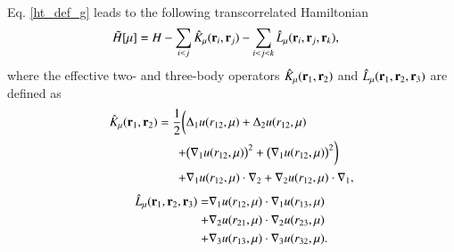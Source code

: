 \documentclass[aip,jcp,reprint,noshowkeys,superscriptaddress,twocolumn]{revtex4-1}
\newcommand{\bri}[1]{{\bf r}_{#1}}
\begin{document}
Eq. \eqref{ht_def_g} leads to the following transcorrelated Hamiltonian 
\begin{equation}
 \begin{aligned}
 \label{ht_def_gu}
 \tilde{H}[\mu] & = H - \sum_{i<j} \hat{K}_\mu(\bri{i},\bri{j}) - \sum_{i<j<k} \hat{L}_\mu(\bri{i},\bri{j},\bri{k}),
 \end{aligned}
\end{equation}
where the effective two- and three-body operators $\hat{K}_\mu(\bri{1},\bri{2})$ and $\hat{L}_\mu(\bri{1},\bri{2},\bri{3})$ are defined as
\begin{equation}
 \begin{aligned}
 \label{def_k}
  \hat{K}_\mu(\bri{1},\bri{2})  = \frac{1}{2} \bigg( &\Delta_1 u(r_{12},\mu) + \Delta_2 u(r_{12},\mu) \\
                                               + &\big(\nabla_1 u(r_{12},\mu) \big) ^2 + \big(\nabla_1 u(r_{12},\mu) \big) ^2 \bigg) \\
                                               + &\nabla_1 u(r_{12},\mu) \cdot \nabla_2 + \nabla_2 u(r_{12},\mu)\cdot \nabla_1,
 \end{aligned}
\end{equation}
\begin{equation}
 \begin{aligned}
 \label{def_k}
  \hat{L}_\mu(\bri{1},\bri{2},\bri{3})  = &   \nabla_1 u(r_{12},\mu) \cdot \nabla_1 u(r_{13},\mu) \\
                                          + & \nabla_2 u(r_{21},\mu) \cdot \nabla_2 u(r_{23},\mu)  \\
                                          + & \nabla_3 u(r_{13},\mu) \cdot \nabla_3 u(r_{32},\mu).
 \end{aligned}
\end{equation}
\end{document}
